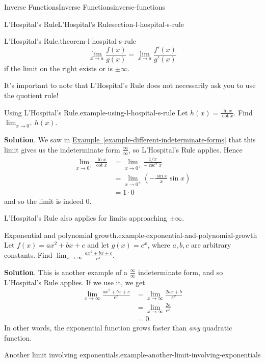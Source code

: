 \documentclass[oneside,10pt,]{book}
\numberwithin{equation}{section}
\begin{document}
\begin{chapterptx}{Inverse Functions}{}{Inverse Functions}{}{}{inverse-functions}
\begin{sectionptx}{L'Hospital's Rule}{}{L'Hospital's Rule}{}{}{section-l-hospital-s-rule}
\begin{theorem}{L'Hospital's Rule.}{}{theorem-l-hospital-s-rule}
\begin{equation*}
\lim_{x\to a}\frac{f(x)}{g(x)} = \lim_{x\to a}\frac{f'(x)}{g'(x)}
\end{equation*}
if the limit on the right exists or is \(\pm\infty\).%
\end{theorem}
\hypertarget{p-288}{}%
It's important to note that L'Hospital's Rule does not necessarily ask you to use the quotient rule!%
\begin{example}{Using L'Hospital's Rule.}{example-using-l-hospital-s-rule}%
\hypertarget{p-289}{}%
Let \(h(x) = \frac{\ln x}{\cot x}\). Find \(\lim_{x\to0^{+}}h(x)\).%
\par\smallskip%
\noindent\textbf{Solution}.\hypertarget{solution-63}{}\quad%
\hypertarget{p-290}{}%
We saw in \hyperref[example-different-indeterminate-forms]{Example~\ref{example-different-indeterminate-forms}} that this limit gives us the indeterminate form \(\frac{\infty}{\infty}\), so L'Hospital's Rule applies. Hence%
\begin{align*}
\lim_{x\to0^{+}}\frac{\ln x}{\cot x} & = \lim_{x\to0^{+}}\frac{1/x}{-\csc^{2}x} \\
& = \lim_{x\to0^{+}}\left(-\frac{\sin x}{x}\sin x\right) \\
& = 1\cdot0 
\end{align*}
and so the limit is indeed \(0\).%
\end{example}
\hypertarget{p-291}{}%
L'Hospital's Rule also applies for limits approaching \(\pm\infty\).%
\begin{example}{Exponential and polynomial growth.}{example-exponential-and-polynomial-growth}%
\hypertarget{p-292}{}%
Let \(f(x) = ax^{2} + bx + c\) and let \(g(x) = e^{x}\), where \(a,b,c\) are arbitrary constants. Find \(\lim_{x\to\infty}\frac{ax^{2} + bx + c}{e^{x}}\).%
\par\smallskip%
\noindent\textbf{Solution}.\hypertarget{solution-64}{}\quad%
\hypertarget{p-293}{}%
This is another example of a \(\frac{\infty}{\infty}\) indeterminate form, and so L'Hospital's Rule applies. If we use it, we get%
\begin{align*}
\lim_{x\to\infty}\frac{ax^{2} + bx + c}{e^{x}} & = \lim_{x\to\infty}\frac{2ax+b}{e^{x}} \\
& = \lim_{x\to\infty}\frac{2a}{e^{x}} \\
& = 0. 
\end{align*}
In other words, the exponential function grows faster than \emph{any} quadratic function.%
\end{example}
\begin{example}{Another limit involving exponentials.}{example-another-limit-involving-exponentials}%

\end{example}
\end{sectionptx}
\end{chapterptx}
\end{document}
